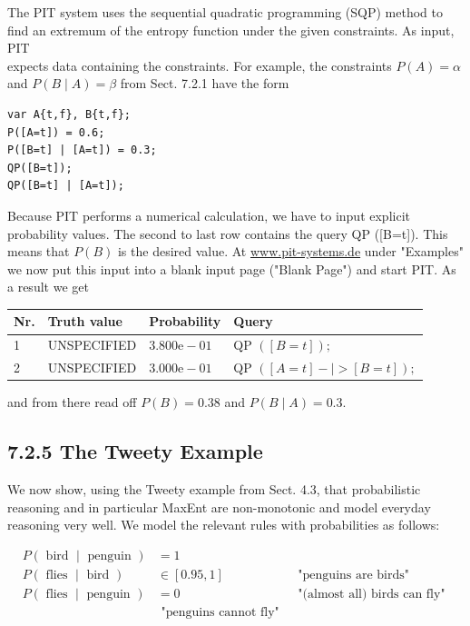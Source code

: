 \documentclass[10pt]{article}
\begin{document}
The PIT system uses the sequential quadratic programming (SQP) method to find an extremum of the entropy function under the given constraints. As input, PIT\\
expects data containing the constraints. For example, the constraints $P(A)=\alpha$ and $P(B \mid A)=\beta$ from Sect. 7.2.1 have the form


\begin{verbatim}
var A{t,f}, B{t,f};
P([A=t]) = 0.6;
P([B=t] | [A=t]) = 0.3;
QP([B=t]);
QP([B=t] | [A=t]);
\end{verbatim}

Because PIT performs a numerical calculation, we have to input explicit probability values. The second to last row contains the query QP ([B=t]). This means that $P(B)$ is the desired value. At \href{http://www.pit-systems.de}{www.pit-systems.de} under "Examples" we now put this input into a blank input page ("Blank Page") and start PIT. As a result we get

\begin{center}
\begin{tabular}{llll}
\hline
Nr. & Truth value & Probability & Query \\
\hline
1 & UNSPECIFIED & $3.800 \mathrm{e}-01$ & QP $([B=t]) ;$ \\
\hline
2 & UNSPECIFIED & $3.000 \mathrm{e}-01$ & QP $([A=t]-\mid>[B=t]) ;$ \\
\hline
\end{tabular}
\end{center}

and from there read off $P(B)=0.38$ and $P(B \mid A)=0.3$.

\subsection*{7.2.5 The Tweety Example}
We now show, using the Tweety example from Sect. 4.3, that probabilistic reasoning and in particular MaxEnt are non-monotonic and model everyday reasoning very well. We model the relevant rules with probabilities as follows:

$$
\begin{array}{lll}
P(\text { bird } \mid \text { penguin }) & =1 & \\
P(\text { flies } \mid \text { bird }) & \in[0.95,1] & \text { "penguins are birds" } \\
P(\text { flies } \mid \text { penguin }) & =0 & \text { "(almost all) birds can fly" } \\
& \text { "penguins cannot fly" }
\end{array}
$$
\end{document}
